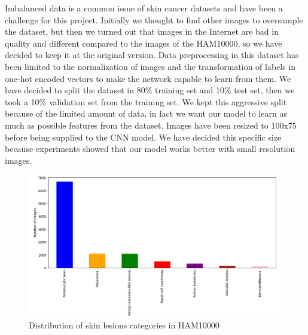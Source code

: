 	Imbalanced data is a common issue of skin cancer datasets and have been a challenge for this project. Initially we thought to find other images to oversample the dataset, but then we turned out that images in the Internet are bad in quality and different compared to the images of the HAM10000, so we have decided to keep it at the original version.
	Data preprocessing in this dataset has been limited to the normalization of images and the transformation of labels in one-hot encoded vectors to make the network capable to learn from them. We have decided to split the dataset in 80\% training set and 10\% test set, then we took a 10\% validation set from the training set. We kept this aggressive split because of the limited amount of data, in fact we want our model to learn as much as possible features from the dataset. Images have been resized to 100x75 before being supplied to the CNN model. We have decided this specific size because experiments showed that our model works better with small resolution images.
	
	\begin{figure}[H]
		\centering
		\includegraphics[width=15cm]{images/graph1.png}
		\caption{Distribution of skin lesions categories in HAM10000}
		\label{fig:graph1}
	\end{figure}